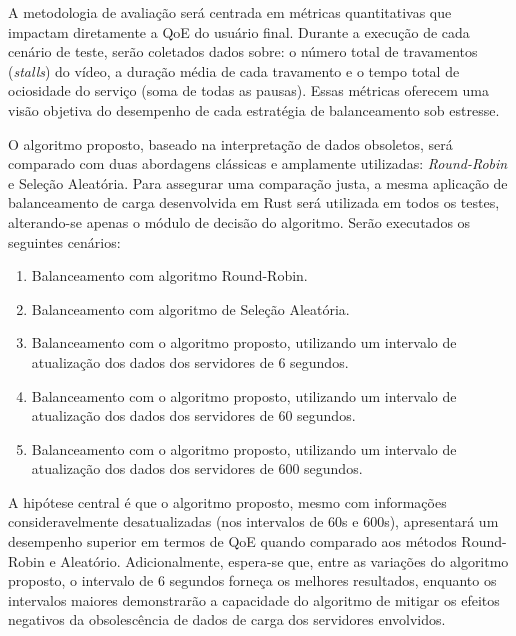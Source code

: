 A metodologia de avaliação será centrada em métricas quantitativas que impactam diretamente a QoE do usuário final. Durante a execução de cada cenário de teste, serão coletados dados sobre: o número total de travamentos (\textit{stalls}) do vídeo, a duração média de cada travamento e o tempo total de ociosidade do serviço (soma de todas as pausas). Essas métricas oferecem uma visão objetiva do desempenho de cada estratégia de balanceamento sob estresse.

O algoritmo proposto, baseado na interpretação de dados obsoletos, será comparado com duas abordagens clássicas e amplamente utilizadas: \textit{Round-Robin} e Seleção Aleatória. Para assegurar uma comparação justa, a mesma aplicação de balanceamento de carga desenvolvida em Rust será utilizada em todos os testes, alterando-se apenas o módulo de decisão do algoritmo. Serão executados os seguintes cenários:

\begin{enumerate}
    \item{Balanceamento com algoritmo Round-Robin.}
    \item{Balanceamento com algoritmo de Seleção Aleatória.}
    \item{Balanceamento com o algoritmo proposto, utilizando um intervalo de atualização dos dados dos servidores de 6 segundos.}
    \item{Balanceamento com o algoritmo proposto, utilizando um intervalo de atualização dos dados dos servidores de 60 segundos.}
    \item{Balanceamento com o algoritmo proposto, utilizando um intervalo de atualização dos dados dos servidores de 600 segundos.}
\end{enumerate}

A hipótese central é que o algoritmo proposto, mesmo com informações consideravelmente desatualizadas (nos intervalos de 60s e 600s), apresentará um desempenho superior em termos de QoE quando comparado aos métodos Round-Robin e Aleatório. Adicionalmente, espera-se que, entre as variações do algoritmo proposto, o intervalo de 6 segundos forneça os melhores resultados, enquanto os intervalos maiores demonstrarão a capacidade do algoritmo de mitigar os efeitos negativos da obsolescência de dados de carga dos servidores envolvidos.

